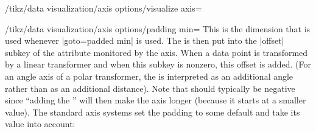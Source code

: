 \begin{key}{/tikz/data visualization/axis options/visualize axis=}
    \begin{key}{/tikz/data visualization/axis options/padding min=}
        This is the dimension that is used whenever |goto=padded min| is used. The  is then put into the |offset| subkey of the attribute monitored by the axis. When a data point is transformed by a linear transformer and when this subkey is nonzero, this offset is added. (For an angle axis of a polar transformer, the  is interpreted as an additional angle rather than as an additional distance). Note that  should typically be negative since ``adding the '' will then make the axis longer (because it starts at a smaller value). The standard axis systems set the padding to some default and take its value into account:
\begin{codeexample}[
    width=8cm,
    preamble={\usetikzlibrary{datavisualization.formats.functions}},
]
\end{codeexample}


\end{key}
\end{key}
